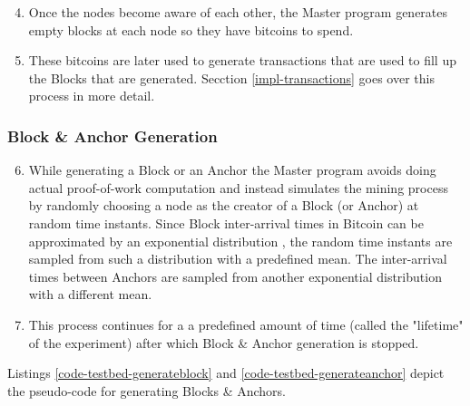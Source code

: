 
\begin{enumerate}
    \setcounter{enumi}{3}
    \item Once the nodes become aware of each other, the Master program generates empty blocks at each node so they have bitcoins to spend.
    
    \item These bitcoins are later used to generate transactions that are used to fill up the Blocks that are generated.
          Secction \ref{impl-transactions} goes over this process in more detail.
\end{enumerate}

\subsubsection{Block \& Anchor Generation}

\begin{enumerate}
    \setcounter{enumi}{5}
    \item While generating a Block or an Anchor the Master program avoids doing actual proof-of-work computation and instead simulates the mining process by randomly choosing a node as the creator of a Block (or Anchor) at random time instants.
    Since Block inter-arrival times in Bitcoin can be approximated by an exponential distribution \cite{bitcoinOriginal}, the random time instants are sampled from such a distribution with a predefined mean.
    The inter-arrival times between Anchors are sampled from another exponential distribution with a different mean.

    \item This process continues for a a predefined amount of time (called the "lifetime" of the experiment) after which Block \& Anchor generation is stopped.
\end{enumerate}

Listings \ref{code-testbed-generateblock} and \ref{code-testbed-generateanchor} depict the pseudo-code for generating Blocks \& Anchors.

